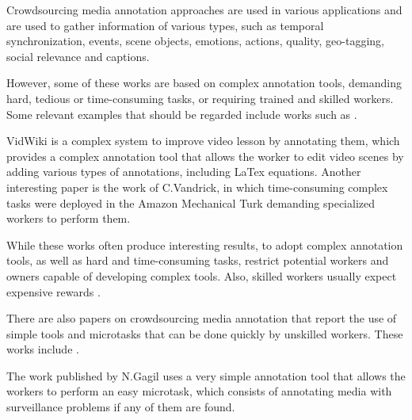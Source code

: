 


Crowdsourcing media annotation approaches are used in various applications and are used to gather information of various types, such as temporal synchronization\cite{wu2014crowdsourced}, events\cite{Kim:2014:JSL:2679600.2680027}, scene objects\cite{vidwiki2014}, emotions\cite{sanchez2015mood}, actions\cite{desell2015effectiveness}, quality\cite{han2014quality}, geo-tagging\cite{chen2015crowd}, social relevance\cite{santos2014towards} and captions\cite{deshpande2014crowdsourcing}. 

However, some of these works are based on complex annotation tools, demanding hard, tedious or time-consuming tasks, or requiring trained and skilled workers. Some relevant examples that should be regarded include works such as \cite{vidwiki2014,Vondrick:2013:ESU:2436010.2436013,park2014toward,desell2015effectiveness}.

VidWiki\cite{vidwiki2014} is a complex system to improve video lesson by annotating them, which provides a complex annotation tool that allows the worker to edit video scenes by adding various types of annotations, including LaTex equations. Another interesting paper is the work of C.Vandrick\cite{Vondrick:2013:ESU:2436010.2436013}, in which time-consuming complex tasks were deployed in the Amazon Mechanical Turk\cite{gottlieb2012pushing} demanding specialized workers to perform them. 

While these works often produce interesting results, to adopt complex annotation tools, as well as hard and time-consuming tasks, restrict potential workers and owners capable of developing complex tools. Also, skilled workers usually expect expensive rewards \cite{Dontcheva:2014:CCL:2556288.2557217}.

There are also papers on crowdsourcing media annotation that report the use of simple tools and microtasks that can be done quickly by unskilled workers. These works include \cite{Chen:2017:RIM:3025453.3025969,Kim:2014:JSL:2679600.2680027,gadgil2014web,wu2014crowdsourced,sulser2014crowd}.

The work published by N.Gagil \cite{gadgil2014web} uses a very simple annotation tool that allows the workers to perform an easy microtask, which consists of annotating media with surveillance problems if any of them are found.




